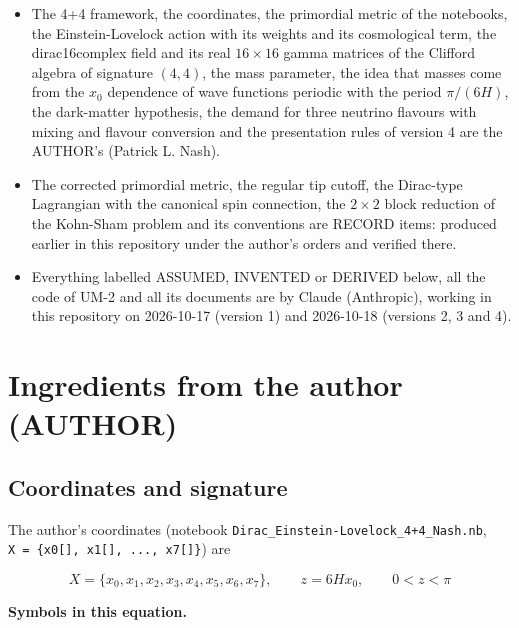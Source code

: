 \documentclass[
  10pt,
]{article}
\providecommand{\tightlist}{%
  \setlength{\itemsep}{0pt}\setlength{\parskip}{0pt}}
\begin{document}
\begin{itemize}
\tightlist
\item
  The 4+4 framework, the coordinates, the primordial metric of the
  notebooks, the Einstein-Lovelock action with its weights and its
  cosmological term, the dirac16complex field and its real
  \(16\times16\) gamma matrices of the Clifford algebra of signature
  \((4, 4)\), the mass parameter, the idea that masses come from the
  \(x_0\) dependence of wave functions periodic with the period
  \(\pi/(6H)\), the dark-matter hypothesis, the demand for three
  neutrino flavours with mixing and flavour conversion and the
  presentation rules of version 4 are the AUTHOR's (Patrick L. Nash).
\item
  The corrected primordial metric, the regular tip cutoff, the
  Dirac-type Lagrangian with the canonical spin connection, the
  \(2\times2\) block reduction of the Kohn-Sham problem and its
  conventions are RECORD items: produced earlier in this repository
  under the author's orders and verified there.
\item
  Everything labelled ASSUMED, INVENTED or DERIVED below, all the code
  of UM-2 and all its documents are by Claude (Anthropic), working in
  this repository on 2026-10-17 (version 1) and 2026-10-18 (versions 2,
  3 and 4).
\end{itemize}

\hypertarget{ingredients-from-the-author-author}{%
\section{Ingredients from the author
(AUTHOR)}\label{ingredients-from-the-author-author}}

\hypertarget{coordinates-and-signature}{%
\subsection{Coordinates and signature}\label{coordinates-and-signature}}

The author's coordinates (notebook
\texttt{Dirac\_Einstein-Lovelock\_4+4\_Nash.nb},
\texttt{X\ =\ \{x0{[}{]},\ x1{[}{]},\ ...,\ x7{[}{]}\}}) are

\[
X = \{x_0, x_1, x_2, x_3, x_4, x_5, x_6, x_7\},\qquad z = 6Hx_0,\qquad 0 < z < \pi
\]

\textbf{Symbols in this equation.}
\end{document}
